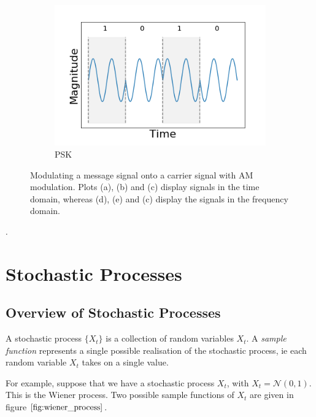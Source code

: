 \documentclass[]{article}
\begin{document}
\begin{figure}[h!]
\begin{subfigure}[b]{0.3\textwidth}
		\includegraphics[width=\textwidth]{figs/shift_keying/phase_shift_keying.png}
		\caption{PSK}
		\label{fig:am_modulated_signal}
	\end{subfigure}
	\caption{Modulating a message signal onto a carrier signal with AM modulation. Plots (a), (b) and (c) display signals in the time domain, whereas (d), (e) and (c) display the signals in the frequency domain.}\label{fig:am_modulation}
\end{figure}
\newpage
  $\small.$
\newpage
\section{Stochastic Processes}
\subsection{Overview of Stochastic Processes}
A stochastic process $\{ X_{t} \}$ is a collection of random variables $X_{t}$. A \textit{sample function} represents a single possible realisation of the stochastic process, ie each random variable $X_{t}$ takes on a single value. 


For example, suppose that we have a stochastic process $X_{t}$, with $X_{t} = \mathcal{N}(0,1)$. This is the Wiener process. Two possible sample functions of $X_{t}$ are given in figure $\ref{fig:wiener_process}$.
\end{document}
